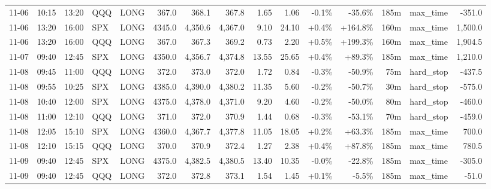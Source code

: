 \documentclass[11pt,a4paper,twoside]{article}
\begin{document}
\begin{landscape}
\begin{center}
\begin{longtable}{>{\color{txtmain}}l l l l l r r r r r r r r >{\color{txtmain}}l r}
11-06 & 10:15 & 13:20 & QQQ & LONG & 367.0 & 368.1 & 367.8 & 1.65 & 1.06 & \textcolor{lossred}{-0.1\%} & \textcolor{lossred}{-35.6\%} & 185m & max\_time & \textcolor{lossred}{-351.0} \\
11-06 & 13:20 & 16:00 & SPX & LONG & 4345.0 & 4,350.6 & 4,367.0 & 9.10 & 24.10 & \textcolor{wingreen}{+0.4\%} & \textcolor{wingreen}{+164.8\%} & 160m & max\_time & \textcolor{wingreen}{1,500.0} \\
11-06 & 13:20 & 16:00 & QQQ & LONG & 367.0 & 367.3 & 369.2 & 0.73 & 2.20 & \textcolor{wingreen}{+0.5\%} & \textcolor{wingreen}{+199.3\%} & 160m & max\_time & \textcolor{wingreen}{1,904.5} \\
11-07 & 09:40 & 12:45 & SPX & LONG & 4350.0 & 4,356.7 & 4,374.8 & 13.55 & 25.65 & \textcolor{wingreen}{+0.4\%} & \textcolor{wingreen}{+89.3\%} & 185m & max\_time & \textcolor{wingreen}{1,210.0} \\
11-08 & 09:45 & 11:00 & QQQ & LONG & 372.0 & 373.0 & 372.0 & 1.72 & 0.84 & \textcolor{lossred}{-0.3\%} & \textcolor{lossred}{-50.9\%} & 75m & hard\_stop & \textcolor{lossred}{-437.5} \\
11-08 & 09:55 & 10:25 & SPX & LONG & 4385.0 & 4,390.0 & 4,380.2 & 11.35 & 5.60 & \textcolor{lossred}{-0.2\%} & \textcolor{lossred}{-50.7\%} & 30m & hard\_stop & \textcolor{lossred}{-575.0} \\
11-08 & 10:40 & 12:00 & SPX & LONG & 4375.0 & 4,378.0 & 4,371.0 & 9.20 & 4.60 & \textcolor{lossred}{-0.2\%} & \textcolor{lossred}{-50.0\%} & 80m & hard\_stop & \textcolor{lossred}{-460.0} \\
11-08 & 11:00 & 12:10 & QQQ & LONG & 371.0 & 372.0 & 370.9 & 1.44 & 0.68 & \textcolor{lossred}{-0.3\%} & \textcolor{lossred}{-53.1\%} & 70m & hard\_stop & \textcolor{lossred}{-459.0} \\
11-08 & 12:05 & 15:10 & SPX & LONG & 4360.0 & 4,367.7 & 4,377.8 & 11.05 & 18.05 & \textcolor{wingreen}{+0.2\%} & \textcolor{wingreen}{+63.3\%} & 185m & max\_time & \textcolor{wingreen}{700.0} \\
11-08 & 12:10 & 15:15 & QQQ & LONG & 370.0 & 370.9 & 372.4 & 1.27 & 2.38 & \textcolor{wingreen}{+0.4\%} & \textcolor{wingreen}{+87.8\%} & 185m & max\_time & \textcolor{wingreen}{780.5} \\
11-09 & 09:40 & 12:45 & SPX & LONG & 4375.0 & 4,382.5 & 4,380.5 & 13.40 & 10.35 & \textcolor{lossred}{-0.0\%} & \textcolor{lossred}{-22.8\%} & 185m & max\_time & \textcolor{lossred}{-305.0} \\
11-09 & 09:40 & 12:45 & QQQ & LONG & 372.0 & 372.8 & 373.1 & 1.54 & 1.45 & \textcolor{wingreen}{+0.1\%} & \textcolor{lossred}{-5.5\%} & 185m & max\_time & \textcolor{lossred}{-51.0} \\

\end{longtable}
\end{center}
\end{landscape}
\end{document}

